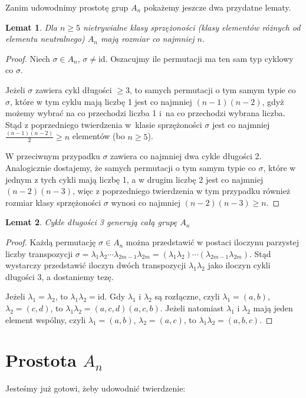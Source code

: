 \documentclass[licencjacka]{pracamgr}
\newtheorem{lemma}{Lemat}[section]
\begin{document}
Zanim udowodnimy prostotę grup $A_n$ pokażemy jeszcze dwa przydatne lematy.

\begin{lemma}\label{lemma_big_con}
	Dla $n \ge 5$ nietrywialne klasy sprzężoności (klasy elementów różnych od elementu neutralnego) $A_n$ mają rozmiar co najmniej $n$.
\end{lemma}
\begin{proof}
	Niech $\sigma \in A_n$, $\sigma \ne \mathrm{id}$.
	Oszacujmy ile permutacji ma ten sam typ cyklowy co $\sigma$.

	Jeżeli $\sigma$ zawiera cykl długości $\ge 3$, to samych permutacji o tym samym typie co $\sigma$, które w tym cyklu mają liczbę 1 jest co najmniej $(n-1)(n-2)$, 
	gdyż możemy wybrać na co przechodzi liczba 1 i~na co przechodzi wybrana liczba. 
	Stąd z poprzedniego twierdzenia w~klasie sprzężoności $\sigma$ jest co najmniej $\frac{(n-1)(n-2)}{2} \ge n$ elementów (bo $n \ge 5$).
	
	W przeciwnym przypadku $\sigma$ zawiera co najmniej dwa cykle długości 2.
	Analogicznie dostajemy, że samych permutacji o tym samym typie co $\sigma$, 
	które w jednym z tych cykli mają liczbę 1, a w drugim liczbę 2 jest co najmniej $(n-2)(n-3)$,
	więc z poprzedniego twierdzenia w tym przypadku również rozmiar klasy sprzężoności $\sigma$ wynosi co najmniej $(n-2)(n-3) \ge n$.
\end{proof}

\begin{lemma}\label{lemma_3cycles}
	Cykle długości 3 generują całą grupę $A_n$
\end{lemma}
\begin{proof}
	Każdą permutację  $\sigma \in A_n$ można przedstawić w postaci iloczynu parzystej liczby transpozycji
	$\sigma = \lambda_1 \lambda_2 \cdots \lambda_{2m-1} \lambda_{2m} = (\lambda_1 \lambda_2) \cdots (\lambda_{2m-1} \lambda_{2m})$.
	Stąd wystarczy przedstawić iloczyn dwóch transpozycji $\lambda_1 \lambda_2$ jako iloczyn cykli długości 3, a dostaniemy tezę.

	Jeżeli $\lambda_1 = \lambda_2$, to $\lambda_1 \lambda_2 = \mathrm{id}$.
	Gdy $\lambda_1$ i $\lambda_2$ są rozłączne, czyli $\lambda_1 = (a, b)$, $\lambda_2 = (c, d)$, to $\lambda_1 \lambda_2 = (a, c, d)(a, c, b)$.
	Jeżeli natomiast $\lambda_1$ i $\lambda_2$ mają jeden element wspólny, 
	czyli $\lambda_1 = (a, b)$, $\lambda_2 = (a, c)$, to $\lambda_1 \lambda_2 = (a, b, c)$.
\end{proof}


\section{Prostota $A_n$}
Jesteśmy już gotowi, żeby udowodnić twierdzenie:
\end{document}
